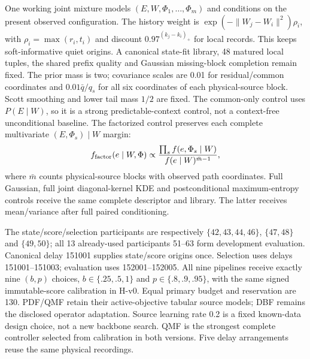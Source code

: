 One working joint mixture models $(E,W,\Phi_1,\ldots,\Phi_m)$ and conditions
on the present observed configuration. The history weight is
$\exp(-\|W_j-W_i\|^2)\rho_i$, with
$\rho_i=\max(r_i,t_i)$ and discount $0.97^{(k_j-k_i)_+}$ for local records.
This keeps soft-informative quiet origins. A canonical state-fit library,
48 matured local tuples, the shared prefix quality and Gaussian missing-block
completion remain fixed. The prior mass is two; covariance scales are 0.01
for residual/common coordinates and $0.01\bar q/q_s$ for all six coordinates
of each physical-source block. Scott smoothing and lower tail mass $1/2$
are fixed. The common-only control uses $P(E\mid W)$, so it is a strong
predictable-context control, not a context-free unconditional baseline.
The factorized control preserves each complete multivariate
$(E,\Phi_s)\mid W$ margin:
\begin{equation}
 f_{\rm factor}(e\mid W,\Phi)\propto
 \frac{\prod_s f(e,\Phi_s\mid W)}{f(e\mid W)^{\bar m-1}},
 \label{eq:h-development-physical-factor}
\end{equation}
where $\bar m$ counts physical-source blocks with observed path coordinates.
Full Gaussian, full joint diagonal-kernel KDE and postconditional
maximum-entropy controls receive the same complete descriptor and library.
The latter receives mean/variance after full paired conditioning.

The state/score/selection participants are respectively
$\{42,43,44,46\}$, $\{47,48\}$ and $\{49,50\}$; all 13 already-used
participants 51--63 form development evaluation. Canonical delay 151001
supplies state/score origins once. Selection uses delays 151001--151003;
evaluation uses 152001--152005. All nine pipelines receive exactly nine
$(b,p)$ choices, $b\in\{.25,.5,1\}$ and $p\in\{.8,.9,.95\}$, with the
same signed immutable-score calibration in H-v0. Equal primary budget and
reservation are 130. PDF/QMF retain their active-objective tabular source
models; DBF remains the disclosed operator adaptation. Source learning rate
0.2 is a fixed known-data design choice, not a new backbone search.
QMF is the strongest complete controller selected from calibration in both
versions. Five delay arrangements reuse the same physical recordings.

